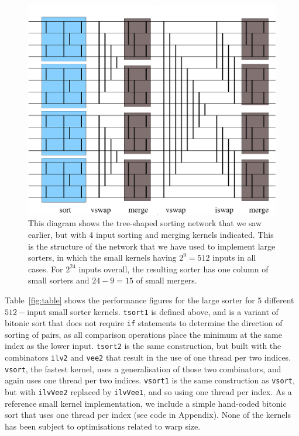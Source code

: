 \documentclass[]{sigplanconf}
\begin{document}
\begin{figure}
\centering
\includegraphics[scale=0.33]{newmixedSorter}
\caption{
This diagram shows the tree-shaped sorting network that we saw earlier, but with 4 input sorting and merging kernels indicated. This is the structure of the network that we have used to implement large sorters, in which the small kernels having {\small $2^9 = 512$} inputs in all cases. For {\small $2^{24}$} inputs overall, the resulting sorter
has one column of small sorters and $24-9=15$ of small mergers.}
\label{fig:newmixedsorter}
\end{figure}

Table~\ref{fig:table} shows the performance figures for the large sorter
for $5$ different $512-$input small sorter kernels.
{\tt tsort1} is defined above, and is a variant of bitonic sort
that does not require {\tt if} statements to determine the direction
of sorting of pairs, as all comparison operations place the minimum at the
same index as the lower input.
{\tt tsort2} is the same construction, but built with the combinators {\tt ilv2}
and {\tt vee2} that result in the use of one thread per two indices.
{\tt vsort}, the fastest kernel, uses a generalisation of those
two combinators, and again uses one thread per two indices.
{\tt vsort1} is the same construction as {\tt vsort}, but with {\tt ilvVee2} replaced
by {\tt ilvVee1}, and so using one thread per index.
As a reference small kernel implementation, we include a simple hand-coded bitonic sort
that uses one thread per index (see code in Appendix).
None of the kernels has been subject to optimisations related to warp size.
\end{document}
